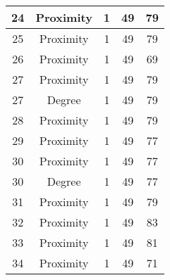 \documentclass[results.tex]{subfiles}
\begin{document}
\begin{center}
\begin{tabular}{| c || c | c | c | c |}
            \hline
            24                      & Proximity                    & 1                      & 49                      & 79                   \\
            \hline
            25                      & Proximity                    & 1                      & 49                      & 79                   \\
            \hline
            26                      & Proximity                    & 1                      & 49                      & 69                   \\
            \hline
            27                      & Proximity                    & 1                      & 49                      & 79                   \\
            \hline
            27                      & Degree                       & 1                      & 49                      & 79                   \\
            \hline
            28                      & Proximity                    & 1                      & 49                      & 79                   \\
            \hline
            29                      & Proximity                    & 1                      & 49                      & 77                   \\
            \hline
            30                      & Proximity                    & 1                      & 49                      & 77                   \\
            \hline
            30                      & Degree                       & 1                      & 49                      & 77                   \\
            \hline
            31                      & Proximity                    & 1                      & 49                      & 79                   \\
            \hline
            32                      & Proximity                    & 1                      & 49                      & 83                   \\
            \hline
            33                      & Proximity                    & 1                      & 49                      & 81                   \\
            \hline
            34                      & Proximity                    & 1                      & 49                      & 71                   \\

\end{tabular}
\end{center}
\end{document}
